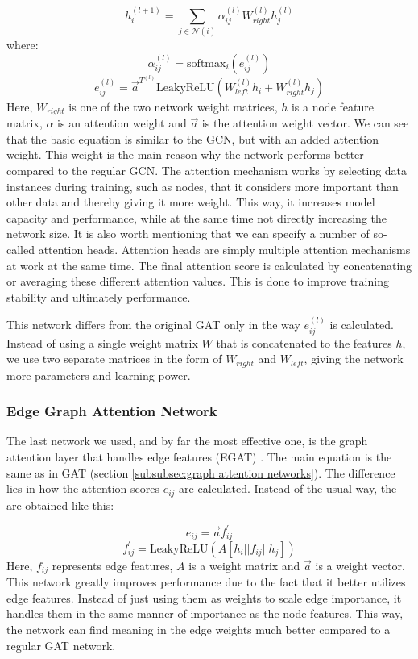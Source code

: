\documentclass[times, utf8, diplomski, english]{fer_eng}
\begin{document}
\[ h_i^{(l+1)} = \sum_{j \in \mathcal{N}(i)} \alpha_{ij}^{(l)} W_{right}^{(l)} h_j^{(l)} \]
where:
\[ \alpha_{ij}^{(l)} = \mathrm{softmax}_i (e_{ij}^{(l)}) \]
\[ e_{ij}^{(l)} = \vec{a}^{T^{(l)}} \mathrm{LeakyReLU} (W_{left}^{(l)} h_i + W_{right}^{(l)} h_j) \]
Here, $W_{right}$ is one of the two network weight matrices, $h$ is a node feature matrix, $\alpha$ is an attention weight and $\vec{a}$ is the attention weight vector. We can see that the basic equation is similar to the GCN, but with an added attention weight. This weight is the main reason why the network performs better compared to the regular GCN. The attention mechanism works by selecting data instances during training, such as nodes, that it considers more important than other data and thereby giving it more weight. This way, it increases model capacity and performance, while at the same time not directly increasing the network size. It is also worth mentioning that we can specify a number of so-called attention heads. Attention heads are simply multiple attention mechanisms at work at the same time. The final attention score is calculated by concatenating or averaging these different attention values. This is done to improve training stability and ultimately performance.

This network differs from the original GAT only in the way $e_{ij}^{(l)}$ is calculated. Instead of using a single weight matrix $W$ that is concatenated to the features $h$, we use two separate matrices in the form of $W_{right}$ and $W_{left}$, giving the network more parameters and learning power.

\subsubsection{Edge Graph Attention Network}
\label{subsubsec:edge graph attention network}

The last network we used, and by far the most effective one, is the graph attention layer that handles edge features (EGAT) \cite{EGAT}. The main equation is the same as in GAT (section \ref{subsubsec:graph attention networks}). The difference lies in how the attention scores $e_{ij}$ are calculated. Instead of the usual way, the are obtained like this:

\[ e_{ij} = \vec{a} f_{ij}^{'} \]
\[ f_{ij}^{'} = \mathrm{LeakyReLU} (A[h_i||f_{ij}||h_j]) \]
Here, $f_{ij}$ represents edge features, $A$ is a weight matrix and $\vec{a}$ is a weight vector. This network greatly improves performance due to the fact that it better utilizes edge features. Instead of just using them as weights to scale edge importance, it handles them in the same manner of importance as the node features. This way, the network can find meaning in the edge weights much better compared to a regular GAT network.
\end{document}

